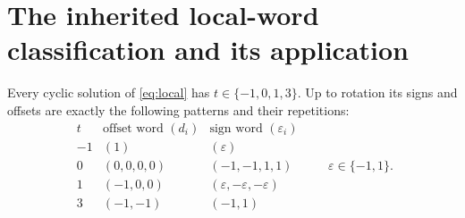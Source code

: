 \section{The inherited local-word classification and its application}
\label{sec:symbols}

\begin{lemma}
\label{lem:local_words}
Every cyclic solution of \eqref{eq:local} has
$t\in\{-1,0,1,3\}$. Up to rotation its signs and offsets are
exactly the following patterns and their repetitions:
\begin{equation}
\begin{array}{c|c|c}
t&\text{offset word }(d_i)&\text{sign word }(\varepsilon_i)\\ \hline
-1&(1)&(\varepsilon)\\
0&(0,0,0,0)&(-1,-1,1,1)\\
1&(-1,0,0)&(\varepsilon,-\varepsilon,-\varepsilon)\\
3&(-1,-1)&(-1,1)
\end{array}
\qquad \varepsilon\in\{-1,1\}.
\label{eq:patterns}
\end{equation}
\end{lemma}
